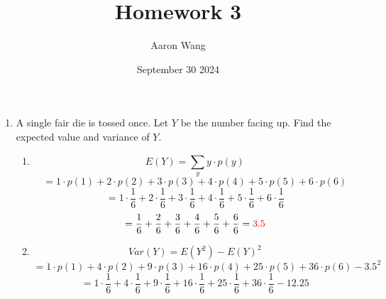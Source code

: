 \documentclass{article}
\title{Homework 3}
\author{Aaron Wang}
\date{September 30 2024}
\newcommand{\expect}{E}
\newcommand{\var}{Var}
\begin{document}
\maketitle
    \begin{enumerate}
        \item A single fair die is tossed once. Let $Y$ be the number facing up. Find the expected value and variance of $Y$.
        \begin{enumerate}
            \item 
        
        \begin{equation*}
            \expect(Y) = \sum\limits_y y\cdot p(y)
        \end{equation*}
        \begin{equation*}
            = 
            1\cdot p(1) +
            2\cdot p(2) +
            3\cdot p(3) +
            4\cdot p(4) +
            5\cdot p(5) +
            6\cdot p(6)
        \end{equation*}
        \begin{equation*}
            = 
            1\cdot \frac{1}{6} +
            2\cdot \frac{1}{6} +
            3\cdot \frac{1}{6} +
            4\cdot \frac{1}{6} +
            5\cdot \frac{1}{6} +
            6\cdot \frac{1}{6}
        \end{equation*}
        \begin{equation*}
            = 
            \frac{1}{6} +
            \frac{2}{6} +
            \frac{3}{6} +
            \frac{4}{6} +
            \frac{5}{6} +
            \frac{6}{6} = \textcolor{red}{3.5}
        \end{equation*}
            \item
        \begin{equation*}
            \var(Y) = \expect(Y^2) - \expect(Y)^2
        \end{equation*}
        \begin{equation*}
            = 
            1\cdot p(1) +
            4\cdot p(2) +
            9\cdot p(3) +
            16\cdot p(4) +
            25\cdot p(5) +
            36\cdot p(6) - 
            3.5^2
        \end{equation*}
        \begin{equation*}
            = 
            1\cdot \frac{1}{6} +
            4\cdot \frac{1}{6} +
            9\cdot \frac{1}{6} +
            16\cdot \frac{1}{6} +
            25\cdot \frac{1}{6} +
            36\cdot \frac{1}{6} - 
            12.25
        \end{equation*}

\end{enumerate}
\end{enumerate}
\end{document}
